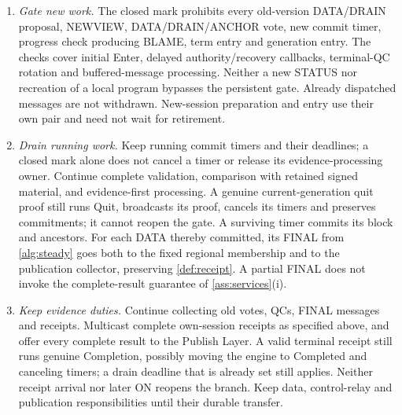 \documentclass[11pt,a4paper]{article}
\begin{document}
\begin{enumerate}[label=(\roman*),itemsep=2pt]
but $c_v$ is not assigned and no $4\Delta$ clock is invented.
Whenever any old-pair ReadyBundle, proposal, authority, history or other packet
provides the missing authenticated snapshot context, the Session Manager
completes and multicasts the close bundle in that receive
handler, and replies with it to the packet's sender. Do this before
ordinary BFT processing, rejecting a live-entry request, discarding a
duplicate, or returning a Terminated/tombstone result. Historical
context is validated without requiring that the old version remain
open. Complete proposals from correct voters carry or resolve this
context within the complete-message bound. This handler is
mandatory even if the old program was never created, its ReadyBundle
is refused, or a delayed callback arrives after exit or restart.
\item \emph{Gate new work.} The closed mark prohibits every old-version
DATA/DRAIN proposal, NEWVIEW, DATA/DRAIN/ANCHOR vote, new commit timer,
progress check producing BLAME, term entry and generation entry.
The checks cover initial Enter, delayed authority/recovery callbacks,
terminal-QC rotation and buffered-message processing. Neither a new
STATUS nor recreation of a local program bypasses the persistent gate.
Already dispatched messages are not withdrawn. New-session preparation
and entry use their own pair and need not wait for retirement.
\item \emph{Drain running work.} Keep running commit timers and
their deadlines; a closed mark alone does not cancel a
timer or release its evidence-processing owner. Continue complete
validation, comparison with retained signed material, and evidence-first
processing. A genuine current-generation quit proof still runs Quit,
broadcasts its proof, cancels its timers and preserves commitments;
it cannot reopen the gate. A surviving timer commits its block and
ancestors. For each DATA thereby committed, its FINAL from \cref{alg:steady} goes
both to the fixed regional membership and to the publication collector,
preserving \cref{def:receipt}. A partial FINAL does not invoke the
complete-result guarantee of \cref{ass:services}(i).
\item \emph{Keep evidence duties.} Continue collecting old votes, QCs,
FINAL messages and receipts. Multicast complete own-session receipts
as specified above, and offer every complete result to the Publish
Layer. A valid terminal receipt still runs genuine Completion,
possibly moving the engine to Completed and canceling timers; a
drain deadline that is already set still applies. Neither receipt arrival nor
later ON reopens the branch. Keep data, control-relay and publication
responsibilities until their durable transfer.
\end{enumerate}
\end{document}
